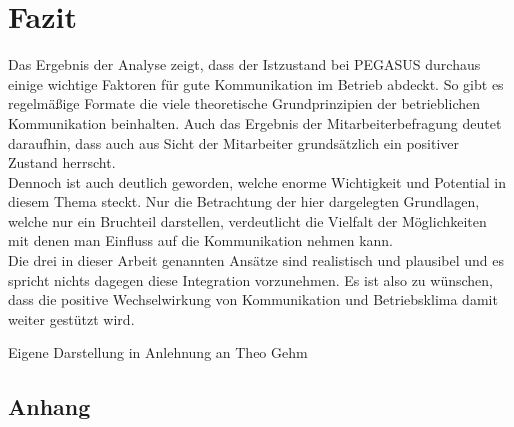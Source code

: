 \documentclass[12pt, DIV9, BCOR9mm, onecolumn, headsepline, ngerman]{scrreprt}
\begin{document}
\chapter{Fazit}

Das Ergebnis der Analyse zeigt, dass der Istzustand bei PEGASUS durchaus einige wichtige Faktoren für gute Kommunikation im Betrieb abdeckt. So gibt es regelmäßige Formate die viele theoretische Grundprinzipien der betrieblichen Kommunikation beinhalten. Auch das Ergebnis der Mitarbeiterbefragung deutet daraufhin, dass auch aus Sicht der Mitarbeiter grundsätzlich ein positiver Zustand herrscht.\\
Dennoch ist auch deutlich geworden, welche enorme Wichtigkeit und Potential in diesem Thema steckt. Nur die Betrachtung der hier dargelegten Grundlagen, welche nur ein Bruchteil darstellen, verdeutlicht die Vielfalt der Möglichkeiten mit denen man Einfluss auf die Kommunikation nehmen kann.\\
Die drei in dieser Arbeit genannten Ansätze sind realistisch und plausibel und es spricht nichts dagegen diese Integration vorzunehmen. Es ist also zu wünschen, dass die positive Wechselwirkung von Kommunikation und Betriebsklima damit weiter gestützt wird.



\newpage
\nocite{*} 


\newpage
{}
\listoffigures
Eigene Darstellung in Anlehnung an Theo Gehm
\newpage
\begin{appendix} 
\chapter{Anhang}






\end{appendix}
\end{document}
